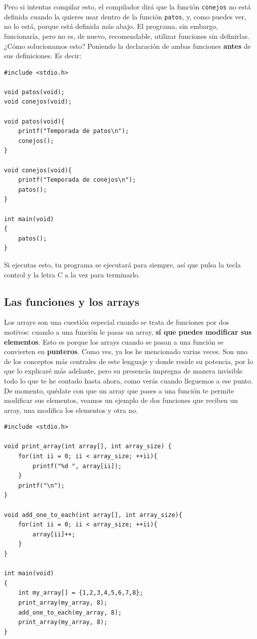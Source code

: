 \documentclass[a4paper]{article}
\begin{document}
Pero si intentas compilar esto, el compilador dirá que la función \verb!conejos!
no está definida cuando la quieres usar dentro de la función \verb!patos!, y,
como puedes ver, no lo está, porque está definida más abajo. El programa, sin
embargo, funcionaría, pero no es, de nuevo, recomendable, utilizar funciones
sin definirlas.
¿Cómo solucionamos
esto? Poniendo la declaración de ambas funciones \textbf{antes} de sus
definiciones. Es decir:


\noindent
\begin{minipage}[H]{\linewidth}
\mbox{}
\begin{lstlisting}[style=C, label={lst:cyclicFunctions},
caption={Declaración separada de definición}]
#include <stdio.h>

void patos(void);
void conejos(void);

void patos(void){
    printf("Temporada de patos\n");
    conejos();
}

void conejos(void){
    printf("Temporada de conejos\n");
    patos();
}

int main(void)
{
    patos();
}
\end{lstlisting}
\end{minipage}


Si ejecutas esto, tu programa se ejecutará para siempre, así que pulsa la tecla
control y la letra C a la vez para terminarlo.

\subsection{Las funciones y los arrays}
Los arrays son una cuestión especial cuando se trata de funciones por dos
motivos: cuando a una función le pasas un array, \textbf{sí que puedes modificar
sus elementos}. Esto es porque los arrays cuando se pasan a una función se
convierten en \textbf{punteros}. Como ves, ya los he mencionado varias veces.
Son uno de los conceptos más centrales de este lenguaje y donde reside su
potencia, por lo que lo explicaré más adelante, pero su presencia impregna
de manera invisible todo lo que te he contado hasta ahora, como verás cuando
lleguemos a ese punto. De momento, quédate con que un array que pases a una
función te permite modificar sus elementos, veamos un ejemplo de dos funciones
que reciben un array, una modifica los elementos y otra no.


\noindent
\begin{minipage}[H]{\linewidth}
\mbox{}
\begin{lstlisting}[style=C, label={lst:arraysAndFunctions},
caption={Uso de arrays en funciones}]
#include <stdio.h>

void print_array(int array[], int array_size) {
    for(int ii = 0; ii < array_size; ++ii){
        printf("%d ", array[ii]);
    }
    printf("\n");
}

void add_one_to_each(int array[], int array_size){
    for(int ii = 0; ii < array_size; ++ii){
        array[ii]++;
    }
}

int main(void)
{
    int my_array[] = {1,2,3,4,5,6,7,8};
    print_array(my_array, 8);
    add_one_to_each(my_array, 8);
    print_array(my_array, 8);
}
\end{lstlisting}
\end{minipage}
\end{document}
